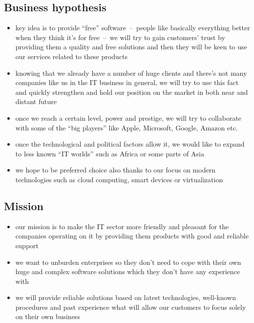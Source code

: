 \documentclass[11pt,a4paper]{article}
\begin{document}
    \subsection{Business hypothesis}
    \begin{itemize}
        \item key idea is to provide “free” software~--~people like basically everything better when they think it’s for free~--~we will try to gain customers’ trust by providing them a quality and free solutions and then they will be keen to use our services related to these products

        \item knowing that we already have a number of huge clients and there’s not many companies like us in the IT business in general, we will try to use this fact and quickly strengthen and hold our position on the market in both near and distant future

        \item once we reach a certain level, power and prestige, we will try to collaborate with some of the “big players” like Apple, Microsoft, Google, Amazon etc.

        \item once the technological and political factors allow it, we would like to expand to less known “IT worlds” such as Africa or some parts of Asia

        \item we hope to be preferred choice also thanks to our focus on modern technologies such as cloud computing, smart devices or virtualization 
    \end{itemize}

    \subsection{Mission}
    \begin{itemize}
        \item our mission is to make the IT sector more friendly and pleasant for the companies operating on it by providing them products with good and reliable support

        \item we want to unburden enterprises so they don’t need to cope with their own huge and complex software solutions which they don’t have any experience with

        \item we will provide reliable solutions based on latest technologies, well-known procedures and past experience what will allow our customers to focus solely on their own business
    \end{itemize}
\end{document}
